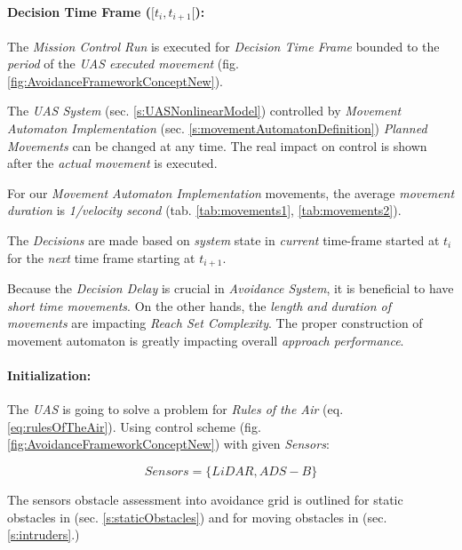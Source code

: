 \paragraph{Decision Time Frame ($[t_i,t_{i+1}[$):} The \emph{Mission Control Run} is executed for \emph{Decision Time Frame} bounded to the \emph{period} of the \emph{UAS executed movement} (fig. \ref{fig:AvoidanceFrameworkConceptNew}).

The \emph{UAS System} (sec. \ref{s:UASNonlinearModel}) controlled by \emph{Movement Automaton Implementation} (sec. \ref{s:movementAutomatonDefinition}) \emph{Planned Movements} can be changed at any time. The real impact on control is shown after the \emph{actual movement} is executed. 

\begin{note}
    For our \emph{Movement Automaton Implementation} movements, the average \emph{movement duration} is \emph{1/velocity second} (tab. \ref{tab:movements1}, \ref{tab:movements2}).
\end{note}

The \emph{Decisions} are made based on \emph{system} state in \emph{current} time-frame started at $t_i$ for the \emph{next} time frame starting at $t_{i+1}$.

\begin{note}
    Because the \emph{Decision Delay} is crucial in \emph{Avoidance System}, it is beneficial to have \emph{short time movements}. On the other hands, the \emph{length and duration  of movements} are impacting \emph{Reach Set Complexity}. The proper construction of movement automaton is greatly impacting overall \emph{approach performance}.
\end{note}

\paragraph{Initialization:} The \emph{UAS} is going to solve a problem for \emph{Rules of the Air} (eq. \ref{eq:rulesOfTheAir}). Using control scheme (fig. \ref{fig:AvoidanceFrameworkConceptNew}) with given \emph{Sensors}:

\begin{equation}
    Sensors = \{LiDAR,ADS-B\}
\end{equation}

\noindent The sensors obstacle assessment into avoidance grid is outlined for static obstacles in (sec. \ref{s:staticObstacles}) and for moving obstacles in (sec. \ref{s:intruders}.)

